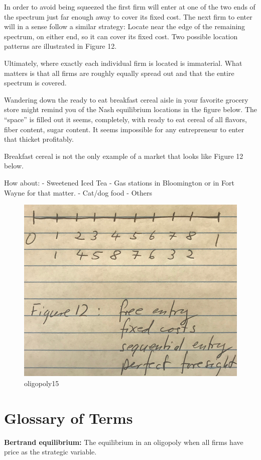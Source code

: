 \documentclass[
]{book}
\begin{document}
In order to avoid being squeezed the first firm will enter at one of the two ends of the spectrum just far enough away to cover its fixed cost. The next firm to enter will in a sense follow a similar strategy: Locate near the edge of the remaining spectrum, on either end, so it can cover its fixed cost. Two possible location patterns are illustrated in Figure 12.

Ultimately, where exactly each individual firm is located is immaterial. What matters is that all firms are roughly equally spread out and that the entire spectrum is covered.

Wandering down the ready to eat breakfast cereal aisle in your favorite grocery store might remind you of the Nash equilibrium locations in the figure below. The ``space'' is filled out it seems, completely, with ready to eat cereal of all flavors, fiber content, sugar content. It seems impossible for any entrepreneur to enter that thicket profitably.

Breakfast cereal is not the only example of a market that looks like Figure 12 below.

How about:
- Sweetened Iced Tea
- Gas stations in Bloomington or in Fort Wayne for that matter.
- Cat/dog food
- Others

\begin{figure}

{\centering \includegraphics[width=0.5\linewidth]{img/oligopoly/fig15} 

}

\caption{oligopoly15}\label{fig:oligopoly15}
\end{figure}

\hypertarget{glossary-of-terms-9}{%
\section{Glossary of Terms}\label{glossary-of-terms-9}}

\textbf{Bertrand equilibrium:} The equilibrium in an oligopoly when all firms have price as the strategic variable.
\end{document}
